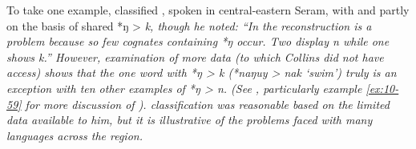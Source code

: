 To take one example,
\citet[129]{Collins1986} classified ,
spoken in central-eastern Seram,
with  and  partly on the basis of shared *ŋ > \it{k},
though he noted: “In  the reconstruction is a problem because
so few cognates containing *ŋ occur.
Two display \it{n} while one shows \it{k}.” However,
examination of more data (to which Collins did not have access)
shows that the one word with *ŋ > \it{k} (*naŋuy > \it{nak} ‘swim’)
truly is an exception with ten other examples of *ŋ > \it{n}.
(See , particularly example
\ref{ex:10-59} for more discussion of ).
\citet{Collins1986} classification was reasonable based on the
limited data available to him,
but it is illustrative of the problems
faced with many languages across the region.


